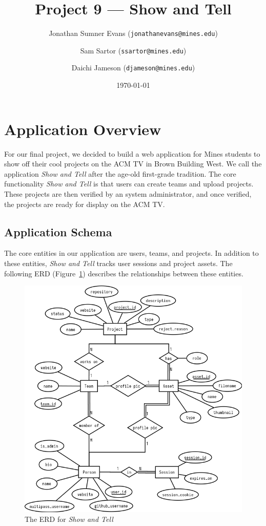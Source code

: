 \documentclass[12pt]{article}
\title{Project 9 --- Show and Tell}
\author{
    Jonathan Sumner Evans (\texttt{jonathanevans@mines.edu})
    \and
    Sam Sartor (\texttt{ssartor@mines.edu})
    \and
    Daichi Jameson (\texttt{djameson@mines.edu})
}
\date{\today}
\newcommand{\app}{\textit{Show and Tell}\xspace}
\begin{document}
\maketitle

\section{Application Overview}
For our final project, we decided to build a web application for Mines students
to show off their cool projects on the ACM TV in Brown Building West. We call
the application \app after the age-old first-grade tradition. The core
functionality \app is that users can create teams and upload projects. These
projects are then verified by an system administrator, and once verified, the
projects are ready for display on the ACM TV.


\subsection{Application Schema}
The core entities in our application are users, teams, and projects. In addition
to these entities, \app tracks user sessions and project assets. The following
ERD (Figure~\ref{fig:erd}) describes the relationships between these entities.

\begin{figure}[H]
    \includegraphics[width=\textwidth]{erd-new}
    \caption{The ERD for \app}
    \label{fig:erd}
\end{figure}
\end{document}

